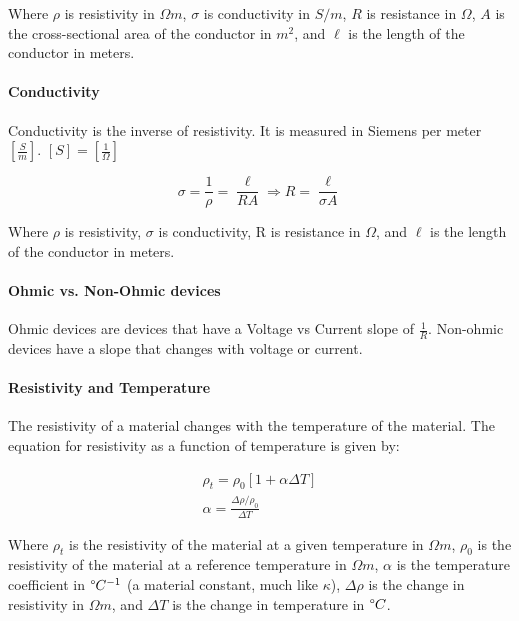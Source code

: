 Where $\rho$ is resistivity in $\Omega m$, $\sigma$ is conductivity in $S/m$, $R$ is resistance in $\Omega$, $A$ is the cross-sectional area of the 
conductor in $m^2$, and $\ell$ is the length of the conductor in meters.\\

\paragraph*{Conductivity}
Conductivity is the inverse of resistivity. It is measured in Siemens per meter $[\frac{S}{m}]$. $[S] = [\frac{1}{\Omega}]$

\begin{equation*}
    \sigma = \frac{1}{\rho} = \frac{\ell}{RA} \Longrightarrow R = \frac{\ell}{\sigma A}
\end{equation*}

Where $\rho$ is resistivity, $\sigma$ is conductivity, R is resistance in $\Omega$, and $\ell$ is the length of the conductor in meters.

\paragraph*{Ohmic vs. Non-Ohmic devices}
Ohmic devices are devices that have a Voltage vs Current slope of $\frac{1}{R}$. Non-ohmic devices have a slope that changes with voltage or current.

\paragraph*{Resistivity and Temperature}
The resistivity of a material changes with the temperature of the material. The equation for resistivity as a function of temperature is given by:

\begin{align*}
    \rho_t = \rho_0[1+\alpha\Delta T]\\
    \alpha = \frac{\Delta \rho/\rho_0}{\Delta T}
\end{align*}

Where $\rho_t$ is the resistivity of the material at a given temperature in $\Omega m$, $\rho_0$ is the resistivity of the material at a reference temperature in $\Omega m$, 
$\alpha$ is the temperature coefficient in $\degree C^{-1}$ (a material constant, much like $\kappa$), $\Delta \rho$ is the change in resistivity in $\Omega m$, 
and $\Delta T$ is the change in temperature in $\degree C$.

\hrulefill

